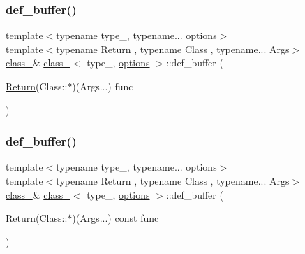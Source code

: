 \mbox{\label{classclass___a13babe9644a320b11f55d4c737780397}} 
\subsubsection{\texorpdfstring{def\_buffer()}{def\_buffer()}\hspace{0.1cm}{\footnotesize\ttfamily [2/3]}}
{\footnotesize\ttfamily template$<$typename type\+\_\+, typename... options$>$ \\
template$<$typename Return , typename Class , typename... Args$>$ \\
\mbox{\hyperlink{classclass__}{class\+\_\+}}\& \mbox{\hyperlink{classclass__}{class\+\_\+}}$<$ type\+\_\+, \mbox{\hyperlink{classoptions}{options}} $>$\+::def\+\_\+buffer (\begin{DoxyParamCaption}\item[{\mbox{\hyperlink{_python-ast_8h_abdae7f49d66ce8e500825bb53aa14901}{Return}}(Class\+::$\ast$)(Args...)}]{func }\end{DoxyParamCaption})\hspace{0.3cm}{\ttfamily [inline]}}

\mbox{\label{classclass___a96ca3406293a4a91090f419590358cd0}} 
\subsubsection{\texorpdfstring{def\_buffer()}{def\_buffer()}\hspace{0.1cm}{\footnotesize\ttfamily [3/3]}}
{\footnotesize\ttfamily template$<$typename type\+\_\+, typename... options$>$ \\
template$<$typename Return , typename Class , typename... Args$>$ \\
\mbox{\hyperlink{classclass__}{class\+\_\+}}\& \mbox{\hyperlink{classclass__}{class\+\_\+}}$<$ type\+\_\+, \mbox{\hyperlink{classoptions}{options}} $>$\+::def\+\_\+buffer (\begin{DoxyParamCaption}\item[{\mbox{\hyperlink{_python-ast_8h_abdae7f49d66ce8e500825bb53aa14901}{Return}}(Class\+::$\ast$)(Args...) const}]{func }\end{DoxyParamCaption})\hspace{0.3cm}{\ttfamily [inline]}}

